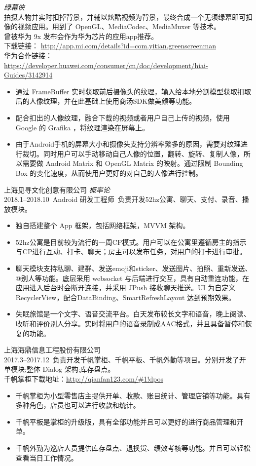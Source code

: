 \documentclass[11pt]{res}
\begin{document}
\begin{resume}
\emph{绿幕侠}\\
拍摄人物并实时扣掉背景，并辅以炫酷视频为背景，最终合成一个无须绿幕即可扣像的视频应用。用到了 OpenGL、MediaCodec、MediaMuxer 等技术。\\
曾被华为 9x 发布会作为华为芯片的应用app推荐。\\
下载链接： \url{http://app.mi.com/details?id=com.yitian.greenscreenman}\\
华为合作链接：\url{https://developer.huawei.com/consumer/cn/doc/development/hiai-Guides/3142914}
\begin{itemize}
\item 通过 FrameBuffer 实时获取前后摄像头的纹理，输入给本地分割模型获取扣取后的人像纹理，并在此基础上使用商汤SDK做美颜等功能。
\item 配合扣出的人像纹理，融合下载的视频或者用户自己上传的视频，使用 Google 的 Grafika ，将纹理渲染在屏幕上。
\item 由于Android手机的屏幕大小和摄像头支持分辨率繁多的原因，需要对纹理进行裁切。同时用户可以手动移动自己人像的位置，翻转、旋转、复制人像，所以需要做 Android Matrix 和 OpenGL Matrix 的映射。通过限制 Bounding Box 的变化速度，从而使用户更好的对自己的人像进行控制。
\end{itemize}

    \large 上海见寻文化创意有限公司 \emph{概率论}\normalsize\\
  \small 2018.1--2018.10\ Android 研发工程师\ 负责开发52hz公寓、聊天、支付、录音、播放模块。\normalsize
  \begin{itemize}
    \item 独自搭建整个 App 框架，包括网络框架，MVVM 架构。 
    \item 52hz公寓是目前较为流行的一周CP模式。用户可以在公寓里遵循房主的指示与CP进行互动、打卡、聊天；房主可以发布任务，对用户的打卡进行审批。
    \item 聊天模块支持私聊、建群、发送emoji和sticker、发送图片、拍照、重新发送、@别人等功能。底层采用 websocket 与后端进行交互，具有自动重连功能，在应用进入后台时会断开连接，并采用 JPush 接收聊天推送。UI 为自定义 RecyclerView，配合DataBinding、SmartRefreshLayout 达到预期效果。
    \item 失眠旅馆是一个文字、语音交流平台。白天发布较长文字和语音，晚上阅读、收听和评价别人分享。实时将用户的语音录制成AAC格式，并且具备暂停和恢复的功能。
  \end{itemize}

\large 上海海鼎信息工程股份有限公司\normalsize\\
  \small 2017.3--2017.12\ 负责开发千帆掌柜、千帆平板、千帆外勤等项目。分别开发了开单模块;整体 Dialog 架构;库存盘点。\\千帆掌柜下载地址：\url{http://qianfan123.com/#1!dpos}\normalsize
  \begin{itemize}
    \item 千帆掌柜为小型零售店主提供开单、收款、账目统计、管理店铺等功能。具有多种角色，店员也可以进行收款和统计。
    \item 千帆平板是掌柜的升级版，具有全部功能并且可以更好的进行商品管理和开单。
    \item 千帆外勤为巡店人员提供库存盘点、退换货、绩效考核等功能。并且可以轻松查看当日工作情况。
  \end{itemize}


\end{resume}
\end{document}
